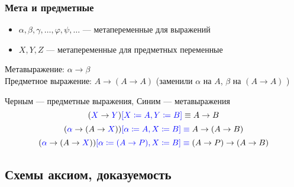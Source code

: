 \documentclass[english]{article}
\begin{document}
\subsubsection{Мета и предметные}
\label{sec:org771f037}
\begin{itemize}
	\item \(\alpha, \beta, \gamma, \dots, \varphi, \psi, \dots\) --- метапеременные для выражений
	\item \(X, Y, Z\) --- метапеременные для предметных переменные
\end{itemize}
Метавыражение: \(\alpha \to \beta\) \\
Предметное выражение: \(A \to (A \to A)\) (заменили \(\alpha\) на \(A\), \(\beta\) на \((A \to A)\) )
\begin{examp}
	Черным --- предметные выражения, Синим --- метавыражения
	\[ (\color{blue}X \color{black}\to\color{blue} Y\color{black})\color{blue}[X \coloneqq A, Y \coloneqq B] \color{black} \equiv A \to B \]
	\[ (\color{blue}\alpha \color{black} \to (A \to \color{blue}X \color{black}))\color{blue}[\alpha \coloneqq A, X \coloneqq B] \equiv \color{black} A \to (A \to B) \]
	\[ (\color{blue}\alpha \color{black} \to (A \to \color{blue}X \color{black}))\color{blue}[\alpha \coloneqq (A \to P), X \coloneqq B] \equiv \color{black} (A \to P) \to (A \to B) \]
\end{examp}
\subsection{Схемы аксиом, доказуемость}
\label{sec:org707e3d8}
\end{document}
